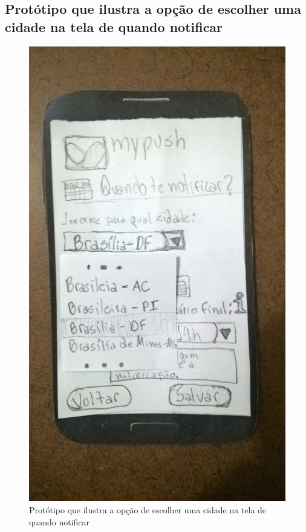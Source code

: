 \begin{apendicesenv}
  \pagebreak
  \section*{Protótipo que ilustra a opção de escolher uma cidade na tela de quando notificar}

    \begin{figure}[!htbp]
      \centering
      \includegraphics[scale=0.32, angle=-90]{editaveis/figuras/prototipo_papel_v2/quando_notificar_cidade}
      \caption{Protótipo que ilustra a opção de escolher uma cidade na tela de quando notificar}
      \label{quando_notificar_cidade_v2}
    \end{figure}
    

\end{apendicesenv}
